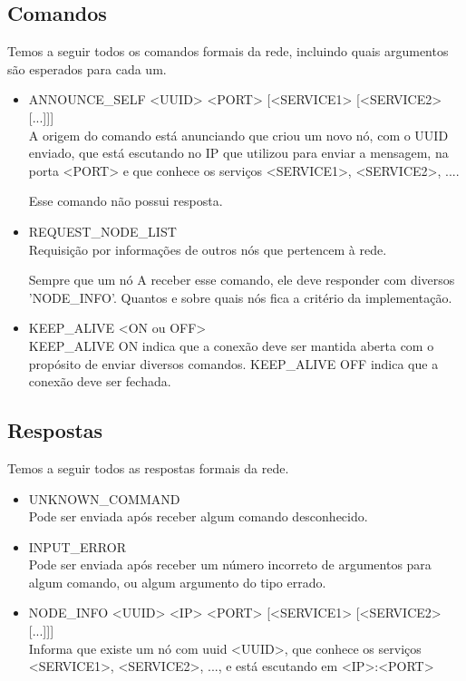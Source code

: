   \subsection{Comandos}
    Temos a seguir todos os comandos formais da rede, incluindo quais argumentos são esperados
    para cada um.
      
    \begin{itemize}
      \item ANNOUNCE\_SELF <UUID> <PORT> [<SERVICE1> [<SERVICE2> [...]]] \\
        A origem do comando está anunciando que criou um novo nó, com o UUID enviado, que está
        escutando no IP que utilizou para enviar a mensagem, na porta <PORT> e que conhece
        os serviços <SERVICE1>, <SERVICE2>, ....
        
        Esse comando não possui resposta.
    
      \item REQUEST\_NODE\_LIST \\
        Requisição por informações de outros nós que pertencem à rede.
        
        Sempre que um nó A receber esse comando, ele deve responder com diversos 'NODE\_INFO'.
        Quantos e sobre quais nós fica a critério da implementação.
        
      \item KEEP\_ALIVE <ON ou OFF> \\
        KEEP\_ALIVE ON indica que a conexão deve ser mantida aberta com o propósito de enviar
        diversos comandos.
        KEEP\_ALIVE OFF indica que a conexão deve ser fechada.
        
    \end{itemize}
  
  \subsection{Respostas}
    Temos a seguir todos as respostas formais da rede.
    
    \begin{itemize}
      \item UNKNOWN\_COMMAND \\
        Pode ser enviada após receber algum comando desconhecido.
        
      \item INPUT\_ERROR \\
        Pode ser enviada após receber um número incorreto de argumentos para algum comando, ou algum
        argumento do tipo errado.
    
      \item NODE\_INFO <UUID> <IP> <PORT> [<SERVICE1> [<SERVICE2> [...]]] \\
        Informa que existe um nó com uuid <UUID>, que conhece os serviços <SERVICE1>, <SERVICE2>, ...,
        e está escutando em <IP>:<PORT>
          
    \end{itemize}
  
